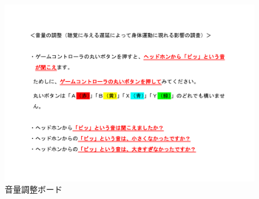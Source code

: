 \begin{figure}[ht]
  \centering
  \includegraphics[scale=0.4]{furoku_A/Onnryou.pdf}
  \caption{音量調整ボード}
\end{figure}





